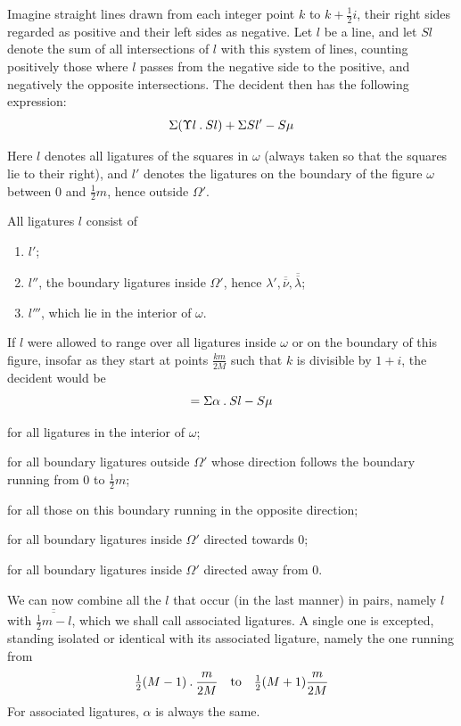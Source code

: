 Imagine straight lines drawn from each integer point $k$ to $k+\frac12i$, their right sides regarded as positive and their left sides as negative. Let $l$ be a line, and let $Sl$ denote the sum of all intersections of $l$ with this system of lines, counting positively those where $l$ passes from the negative side to the positive, and negatively the opposite intersections. The decident then has the following expression:
\[
\Sigma(\Upsilon l\mathbin{.} Sl)+\Sigma Sl'-S\mu
\]

Here $l$ denotes all ligatures of the squares in $\omega$ (always taken so that the squares lie to their right), and $l'$ denotes the ligatures on the boundary of the figure $\omega$ between $0$ and $\frac12m$, hence outside $\Omega'$.

All ligatures $l$ consist of
\begin{enumerate}
\item[1)] $l'$;
\item[2)] $l''$, the boundary ligatures inside $\Omega'$, hence $\lambda',\overline{\overline\nu},\overline{\overline\lambda}$;
\item[3)] $l'''$, which lie in the interior of $\omega$.
\end{enumerate}
If $l$ were allowed to range over all ligatures inside $\omega$ or on the boundary of this figure, insofar as they start at points $\frac{km}{2M}$ such that $k$ is divisible by $1+i$, the decident would be
\[
=\Sigma\alpha\mathbin{.} Sl-S\mu
\]

\begin{list}{}{\setlength{\labelwidth}{5em}\setlength{\leftmargin}{5.5em}}
\item[where $\alpha=1$] for all ligatures in the interior of $\omega$;
\item[$\alpha=\Upsilon l+1$] for all boundary ligatures outside $\Omega'$ whose direction follows the boundary running from $0$ to $\frac12m$;
\end{list}


\begin{list}{}{\setlength{\labelwidth}{9em}\setlength{\leftmargin}{9.5em}}
\item[$\alpha=-(\Upsilon\overline{\overline\lambda}+1)=-\Upsilon l$] for all those on this boundary running in the opposite direction;
\item[$\alpha=\Upsilon l$] for all boundary ligatures inside $\Omega'$ directed towards $0$;
\item[$\alpha=-\Upsilon l+1$] for all boundary ligatures inside $\Omega'$ directed away from $0$.
\end{list}

We can now combine all the $l$ that occur (in the last manner) in pairs, namely $l$ with $\overline{\overline{\frac12m-l}}$, which we shall call associated ligatures. A single one is excepted, standing isolated or identical with its associated ligature, namely the one running from
\[
\tfrac12(M-1)\mathbin{.}\frac{m}{2M}\quad\text{to}\quad\tfrac12(M+1)\frac{m}{2M}
\]
For associated ligatures, $\alpha$ is always the same.
